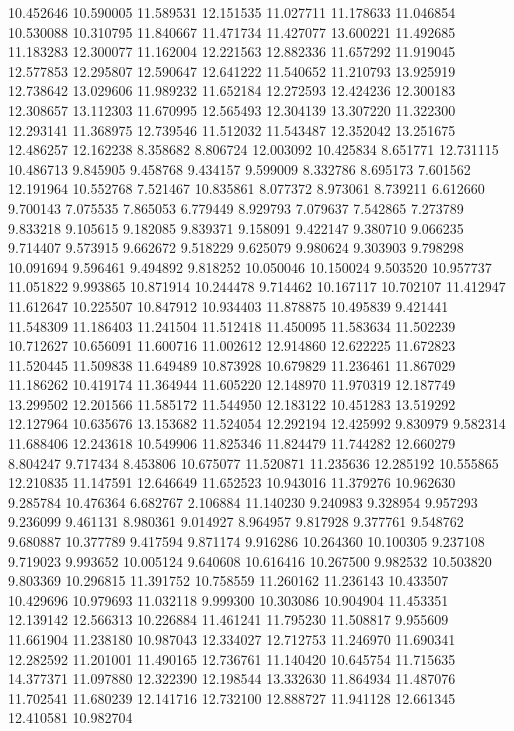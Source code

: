10.452646
10.590005
11.589531
12.151535
11.027711
11.178633
11.046854
10.530088
10.310795
11.840667
11.471734
11.427077
13.600221
11.492685
11.183283
12.300077
11.162004
12.221563
12.882336
11.657292
11.919045
12.577853
12.295807
12.590647
12.641222
11.540652
11.210793
13.925919
12.738642
13.029606
11.989232
11.652184
12.272593
12.424236
12.300183
12.308657
13.112303
11.670995
12.565493
12.304139
13.307220
11.322300
12.293141
11.368975
12.739546
11.512032
11.543487
12.352042
13.251675
12.486257
12.162238
8.358682
8.806724
12.003092
10.425834
8.651771
12.731115
10.486713
9.845905
9.458768
9.434157
9.599009
8.332786
8.695173
7.601562
12.191964
10.552768
7.521467
10.835861
8.077372
8.973061
8.739211
6.612660
9.700143
7.075535
7.865053
6.779449
8.929793
7.079637
7.542865
7.273789
9.833218
9.105615
9.182085
9.839371
9.158091
9.422147
9.380710
9.066235
9.714407
9.573915
9.662672
9.518229
9.625079
9.980624
9.303903
9.798298
10.091694
9.596461
9.494892
9.818252
10.050046
10.150024
9.503520
10.957737
11.051822
9.993865
10.871914
10.244478
9.714462
10.167117
10.702107
11.412947
11.612647
10.225507
10.847912
10.934403
11.878875
10.495839
9.421441
11.548309
11.186403
11.241504
11.512418
11.450095
11.583634
11.502239
10.712627
10.656091
11.600716
11.002612
12.914860
12.622225
11.672823
11.520445
11.509838
11.649489
10.873928
10.679829
11.236461
11.867029
11.186262
10.419174
11.364944
11.605220
12.148970
11.970319
12.187749
13.299502
12.201566
11.585172
11.544950
12.183122
10.451283
13.519292
12.127964
10.635676
13.153682
11.524054
12.292194
12.425992
9.830979
9.582314
11.688406
12.243618
10.549906
11.825346
11.824479
11.744282
12.660279
8.804247
9.717434
8.453806
10.675077
11.520871
11.235636
12.285192
10.555865
12.210835
11.147591
12.646649
11.652523
10.943016
11.379276
10.962630
9.285784
10.476364
6.682767
2.106884
11.140230
9.240983
9.328954
9.957293
9.236099
9.461131
8.980361
9.014927
8.964957
9.817928
9.377761
9.548762
9.680887
10.377789
9.417594
9.871174
9.916286
10.264360
10.100305
9.237108
9.719023
9.993652
10.005124
9.640608
10.616416
10.267500
9.982532
10.503820
9.803369
10.296815
11.391752
10.758559
11.260162
11.236143
10.433507
10.429696
10.979693
11.032118
9.999300
10.303086
10.904904
11.453351
12.139142
12.566313
10.226884
11.461241
11.795230
11.508817
9.955609
11.661904
11.238180
10.987043
12.334027
12.712753
11.246970
11.690341
12.282592
11.201001
11.490165
12.736761
11.140420
10.645754
11.715635
14.377371
11.097880
12.322390
12.198544
13.332630
11.864934
11.487076
11.702541
11.680239
12.141716
12.732100
12.888727
11.941128
12.661345
12.410581
10.982704
